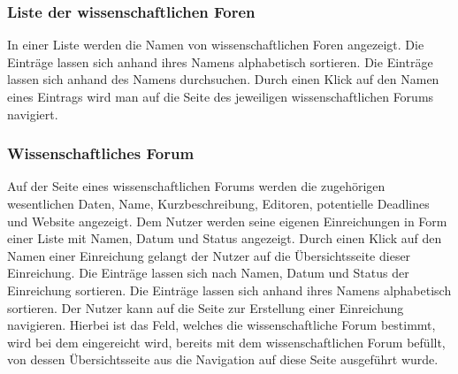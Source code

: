 \subsubsection{Liste der wissenschaftlichen Foren}
\begin{description}
     In einer Liste werden die Namen von wissenschaftlichen Foren angezeigt.
     Die Einträge lassen sich anhand ihres Namens alphabetisch sortieren.
     Die Einträge lassen sich anhand des Namens durchsuchen.
     Durch einen Klick auf den Namen eines Eintrags wird man auf die Seite des
    jeweiligen wissenschaftlichen Forums navigiert.
\end{description}

\subsubsection{Wissenschaftliches Forum}
\begin{description}
     Auf der Seite eines wissenschaftlichen Forums werden die zugehörigen wesentlichen Daten,
    Name, Kurzbeschreibung, Editoren, potentielle Deadlines und Website angezeigt. %
     Dem Nutzer werden seine eigenen Einreichungen in Form einer Liste mit Namen, Datum und Status
    angezeigt.
     Durch einen Klick auf den Namen einer Einreichung gelangt der Nutzer auf die Übersichtsseite
    dieser Einreichung.
     Die Einträge lassen sich nach Namen, Datum und Status
    der Einreichung sortieren.
     Die Einträge lassen sich anhand ihres Namens alphabetisch sortieren.
     Der Nutzer kann auf die Seite zur Erstellung einer Einreichung navigieren. Hierbei ist
    das Feld, welches die wissenschaftliche Forum bestimmt, wird bei dem eingereicht wird, bereits mit
    dem wissenschaftlichen Forum befüllt, von dessen Übersichtsseite aus die Navigation auf diese
    Seite ausgeführt wurde.
\end{description}

